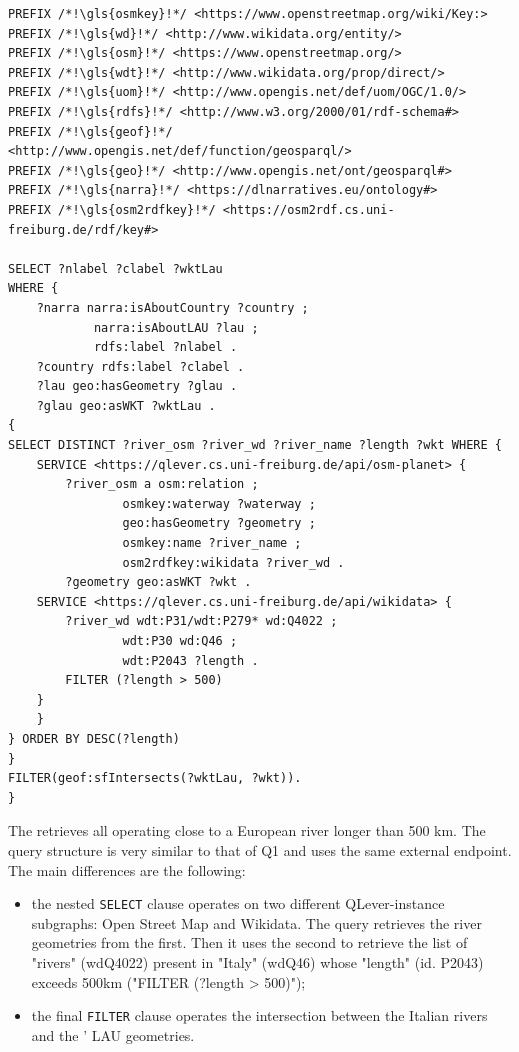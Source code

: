 \begin{lstlisting}[caption=GeoSPARQL Query 4, label={lst:query4}]
PREFIX /*!\gls{osmkey}!*/ <https://www.openstreetmap.org/wiki/Key:>
PREFIX /*!\gls{wd}!*/ <http://www.wikidata.org/entity/>
PREFIX /*!\gls{osm}!*/ <https://www.openstreetmap.org/>
PREFIX /*!\gls{wdt}!*/ <http://www.wikidata.org/prop/direct/>
PREFIX /*!\gls{uom}!*/ <http://www.opengis.net/def/uom/OGC/1.0/>
PREFIX /*!\gls{rdfs}!*/ <http://www.w3.org/2000/01/rdf-schema#>
PREFIX /*!\gls{geof}!*/ <http://www.opengis.net/def/function/geosparql/> 
PREFIX /*!\gls{geo}!*/ <http://www.opengis.net/ont/geosparql#>
PREFIX /*!\gls{narra}!*/ <https://dlnarratives.eu/ontology#>
PREFIX /*!\gls{osm2rdfkey}!*/ <https://osm2rdf.cs.uni-freiburg.de/rdf/key#>

SELECT ?nlabel ?clabel ?wktLau 
WHERE { 
    ?narra narra:isAboutCountry ?country ;
            narra:isAboutLAU ?lau ;
            rdfs:label ?nlabel .
    ?country rdfs:label ?clabel .
    ?lau geo:hasGeometry ?glau .
    ?glau geo:asWKT ?wktLau .
{
SELECT DISTINCT ?river_osm ?river_wd ?river_name ?length ?wkt WHERE {
    SERVICE <https://qlever.cs.uni-freiburg.de/api/osm-planet> {
        ?river_osm a osm:relation ;
                osmkey:waterway ?waterway ;
                geo:hasGeometry ?geometry ;
                osmkey:name ?river_name ;
                osm2rdfkey:wikidata ?river_wd .
        ?geometry geo:asWKT ?wkt .
    SERVICE <https://qlever.cs.uni-freiburg.de/api/wikidata> {
        ?river_wd wdt:P31/wdt:P279* wd:Q4022 ;
                wdt:P30 wd:Q46 ;
                wdt:P2043 ?length .
        FILTER (?length > 500)
    }
    }
} ORDER BY DESC(?length) 
}
FILTER(geof:sfIntersects(?wktLau, ?wkt)). 
}

\end{lstlisting}

The  retrieves all  operating close to a European river longer than 500 km. The query structure is very similar to that of Q1 and uses the same external endpoint. The main differences are the following:
\begin{itemize}
    \item the nested \texttt{SELECT} clause operates on two different QLever-instance subgraphs: Open Street Map and Wikidata. The query retrieves the river geometries from the first. Then it uses the second to retrieve the list of "rivers" (\gls{wd}Q4022) present in "Italy" (\gls{wd}Q46) whose "length" (id. P2043) exceeds 500km ("FILTER (?length > 500)"); 
    \item the final \texttt{FILTER} clause operates the intersection between the Italian rivers and the ' LAU geometries. 
\end{itemize}

